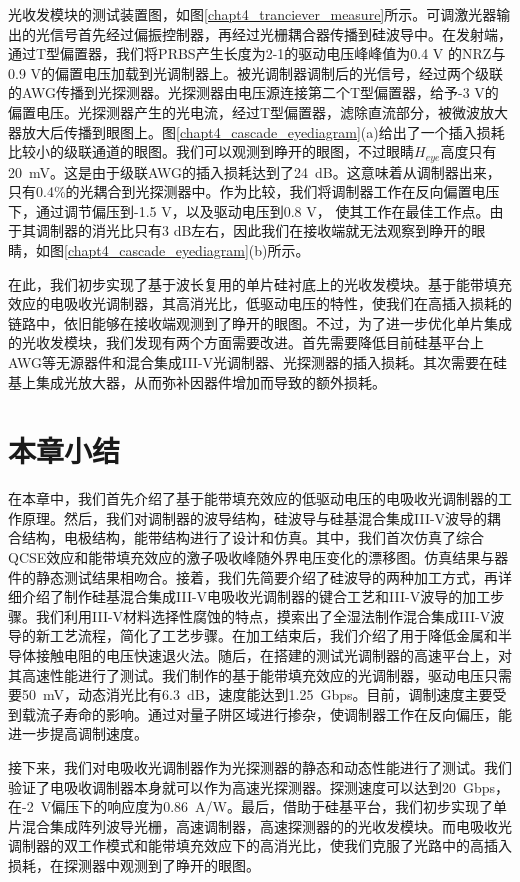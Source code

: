 光收发模块的测试装置图，如图\ref{chapt4_tranciever_measure}所示。可调激光器输出的光信号首先经过偏振控制器，再经过光栅耦合器传播到硅波导中。在发射端，通过T型偏置器，我们将PRBS产生长度为2-1的驱动电压峰峰值为0.4 V
的NRZ与0.9 V的偏置电压加载到光调制器上。被光调制器调制后的光信号，经过两个级联的AWG传播到光探测器。光探测器由电压源连接第二个T型偏置器，给予-3 V的偏置电压。光探测器产生的光电流，经过T型偏置器，滤除直流部分，被微波放大器放大后传播到眼图上。图\ref{chapt4_cascade_eyediagram}(a)给出了一个插入损耗比较小的级联通道的眼图。我们可以观测到睁开的眼图，不过眼睛$H_{eye}$高度只有20~mV。这是由于级联AWG的插入损耗达到了24~dB。这意味着从调制器出来，只有0.4\%的光耦合到光探测器中。作为比较，我们将调制器工作在反向偏置电压下，通过调节偏压到-1.5 V，以及驱动电压到0.8 V， 使其工作在最佳工作点。由于其调制器的消光比只有3 dB左右，因此我们在接收端就无法观察到睁开的眼睛，如图\ref{chapt4_cascade_eyediagram}(b)所示。

在此，我们初步实现了基于波长复用的单片硅衬底上的光收发模块。基于能带填充效应的电吸收光调制器，其高消光比，低驱动电压的特性，使我们在高插入损耗的链路中，依旧能够在接收端观测到了睁开的眼图。不过，为了进一步优化单片集成的光收发模块，我们发现有两个方面需要改进。首先需要降低目前硅基平台上AWG等无源器件和混合集成III-V光调制器、光探测器的插入损耗。其次需要在硅基上集成光放大器，从而弥补因器件增加而导致的额外损耗。

\section{本章小结}
在本章中，我们首先介绍了基于能带填充效应的低驱动电压的电吸收光调制器的工作原理。然后，我们对调制器的波导结构，硅波导与硅基混合集成III-V波导的耦合结构，电极结构，能带结构进行了设计和仿真。其中，我们首次仿真了综合QCSE效应和能带填充效应的激子吸收峰随外界电压变化的漂移图。仿真结果与器件的静态测试结果相吻合。接着，我们先简要介绍了硅波导的两种加工方式，再详细介绍了制作硅基混合集成III-V电吸收光调制器的键合工艺和III-V波导的加工步骤。我们利用III-V材料选择性腐蚀的特点，摸索出了全湿法制作混合集成III-V波导的新工艺流程，简化了工艺步骤。在加工结束后，我们介绍了用于降低金属和半导体接触电阻的电压快速退火法。随后，在搭建的测试光调制器的高速平台上，对其高速性能进行了测试。我们制作的基于能带填充效应的光调制器，驱动电压只需要50~mV，动态消光比有6.3~dB，速度能达到1.25~Gbps。目前，调制速度主要受到载流子寿命的影响。通过对量子阱区域进行掺杂，使调制器工作在反向偏压，能进一步提高调制速度。

接下来，我们对电吸收光调制器作为光探测器的静态和动态性能进行了测试。我们验证了电吸收调制器本身就可以作为高速光探测器。探测速度可以达到20~Gbps，在-2~V偏压下的响应度为0.86~A/W。最后，借助于硅基平台，我们初步实现了单片混合集成阵列波导光栅，高速调制器，高速探测器的的光收发模块。而电吸收光调制器的双工作模式和能带填充效应下的高消光比，使我们克服了光路中的高插入损耗，在探测器中观测到了睁开的眼图。

